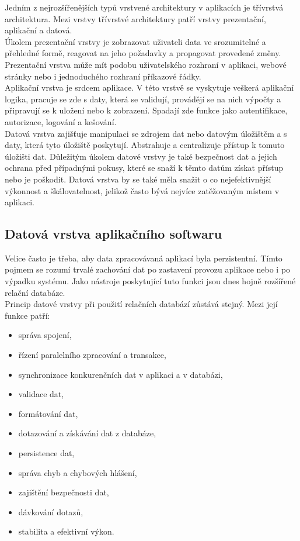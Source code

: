 \documentclass[ing,male,java,dept456]{diploma}						%
\begin{document}
Jedním z nejrozšířenějších typů vrstvené architektury v aplikacích je třívrstvá architektura. Mezi vrstvy třívrstvé architektury patří vrstvy prezentační, aplikační a datová. \\
Úkolem prezentační vrstvy je zobrazovat uživateli data ve srozumitelné a přehledné formě, reagovat na jeho požadavky a propagovat provedené změny. Prezentační vrstva může mít podobu uživatelského rozhraní v aplikaci, webové stránky nebo i jednoduchého rozhraní příkazové řádky. \\
Aplikační vrstva je srdcem aplikace. V této vrstvě se vyskytuje veškerá aplikační logika, pracuje se zde s daty, která se validují, provádějí se na nich výpočty a připravují se k uložení nebo k zobrazení. Spadají zde funkce jako autentifikace, autorizace, logování a kešování. \\
Datová vrstva zajišťuje manipulaci se zdrojem dat nebo datovým úložištěm a s daty, která tyto úložiště poskytují. Abstrahuje a centralizuje přístup k tomuto úložišti dat. Důležitým úkolem datové vrstvy je také bezpečnost dat a jejich ochrana před případnými pokusy, které se snaží k těmto datům získat přístup nebo je poškodit. Datová vrstva by se také měla snažit o co nejefektivnější výkonnost a škálovatelnost, jelikož často bývá nejvíce zatěžovaným místem v aplikaci. \\

\subsection{Datová vrstva aplikačního softwaru}
\label{subsec:Data-layer}
Velice často je třeba, aby data zpracovávaná aplikací byla perzistentní. Tímto pojmem se rozumí trvalé zachování dat po zastavení provozu aplikace nebo i po výpadku systému. Jako nástroje poskytující tuto funkci jsou dnes hojně rozšířené relační databáze. \\
Princip datové vrstvy při použití relačních databází zůstává stejný. Mezi její funkce patří:
\begin{itemize}
\item správa spojení,
\item řízení paralelního zpracování a transakce,
\item synchronizace konkurenčních dat v aplikaci a v databázi,
\item validace dat,
\item formátování dat,
\item dotazování a získávání dat z databáze,
\item persistence dat,
\item správa chyb a chybových hlášení,
\item zajištění bezpečnosti dat,
\item dávkování dotazů,
\item stabilita a efektivní výkon.
\end{itemize}
\end{document}
